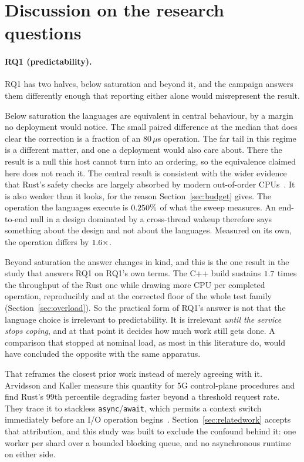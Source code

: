 \documentclass[english,oneside,a4paper,censored,csm,software-track-2020]{HYthesisML}
\begin{document}
\section{Discussion on the research questions}\label{sec:rqdiscussion}
\paragraph{RQ1 (predictability).} RQ1 has two halves, below saturation and beyond it, and the
campaign answers them differently enough that reporting either alone would misrepresent the
result.

Below saturation the languages are equivalent in central behaviour, by a margin no deployment
would notice. The small paired difference at the median that does clear the correction is a
fraction of an $80\,\mu$s operation. The far tail in this regime is a different matter, and one a
deployment would also care about. There the result is a null this host cannot turn into an
ordering, so the equivalence claimed here does not reach it. The central result is consistent with
the wider evidence that
Rust's safety checks are largely absorbed by modern out-of-order
CPUs~\cite{balasubramanian2017rust,emmerich2019drivers}. It is also weaker than it
looks, for the reason Section~\ref{sec:budget} gives. The operation the
languages execute is $0.250\%$ of what the sweep measures. An end-to-end null in
a design dominated by a cross-thread wakeup therefore says something about the design and not
about the languages. Measured on its own, the operation differs by $1.6\times$.

Beyond saturation the answer changes in kind, and this is the one result in the study that answers
RQ1 on RQ1's own terms. The C++ build sustains $1.7$ times the throughput of the
Rust one while drawing more CPU per completed operation, reproducibly and at the corrected floor
of the whole test family (Section~\ref{sec:overload}). So the practical form of RQ1's answer is
not that the language choice is irrelevant to predictability. It is irrelevant \emph{until the
service stops coping}, and at that point it decides how
much work still gets done. A comparison that stopped at nominal load, as most in this literature
do, would have concluded the opposite with the same apparatus.

That reframes the closest prior work instead of merely agreeing with it. Arvidsson and Kaller
measure this quantity for 5G control-plane procedures and find Rust's 99th percentile degrading
faster beyond a threshold request rate. They trace it to stackless
\texttt{async}/\texttt{await}, which permits a context switch immediately before an I/O operation
begins~\cite{arvidsson2025async}. Section~\ref{sec:relatedwork} accepts that attribution, and
this study was built to exclude the confound behind it: one worker per shard over a bounded
blocking queue, and no asynchronous runtime on either side.
\end{document}

